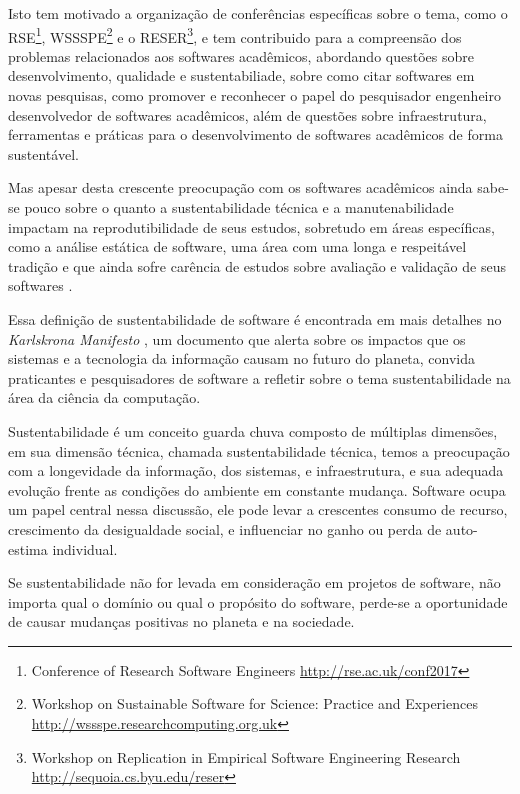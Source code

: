 Isto tem motivado a organização de conferências específicas sobre o tema, como
o RSE\footnote{Conference of Research Software Engineers
\url{http://rse.ac.uk/conf2017}}, WSSSPE\footnote{Workshop on Sustainable
Software for Science: Practice and Experiences
\url{http://wssspe.researchcomputing.org.uk}} e o RESER\footnote{Workshop on
Replication in Empirical Software Engineering Research
\url{http://sequoia.cs.byu.edu/reser}}, e tem contribuido para a compreensão
dos problemas relacionados aos softwares acadêmicos, abordando questões sobre
desenvolvimento, qualidade e sustentabiliade, sobre como citar softwares em
novas pesquisas, como promover e reconhecer o papel do pesquisador engenheiro
desenvolvedor de softwares acadêmicos, além de questões sobre infraestrutura,
ferramentas e práticas para o desenvolvimento de softwares acadêmicos de
forma sustentável.

Mas apesar desta crescente preocupação com os softwares acadêmicos ainda
sabe-se pouco sobre o quanto a sustentabilidade técnica e a manutenabilidade
impactam na reprodutibilidade de seus estudos, sobretudo em áreas específicas,
como a análise estática de software, uma área com uma longa e respeitável
tradição e que ainda sofre carência de estudos sobre avaliação e validação de
seus softwares \cite{Li2010, ilyas2016static}.




Essa definição de sustentabilidade de software é encontrada em mais detalhes no
{\it Karlskrona Manifesto} \cite{becker2014karlskrona}, um documento que alerta
sobre os impactos que os sistemas e a tecnologia da informação causam no futuro
do planeta, convida praticantes e pesquisadores de software a refletir sobre
o tema sustentabilidade na área da ciência da computação.

Sustentabilidade é um conceito guarda chuva composto de múltiplas dimensões, em
sua dimensão técnica, chamada sustentabilidade técnica, temos a preocupação com
a longevidade da informação, dos sistemas, e infraestrutura, e sua adequada
evolução frente as condições do ambiente em constante mudança. Software ocupa
um papel central nessa discussão, ele pode levar a crescentes consumo de
recurso, crescimento da desigualdade social, e influenciar no ganho ou perda de
auto-estima individual.

Se sustentabilidade não for levada em consideração em projetos de software, não
importa qual o domínio ou qual o propósito do software, perde-se a oportunidade
de causar mudanças positivas no planeta e na sociedade.

